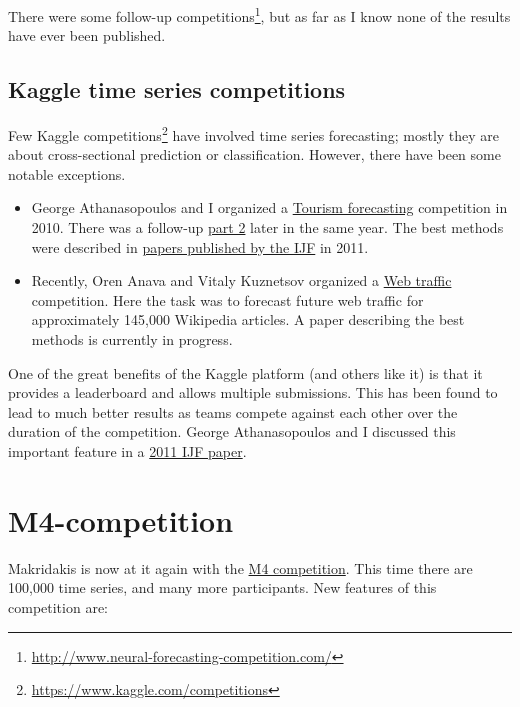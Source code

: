 \documentclass[11pt,a4paper,]{article}
\begin{document}
There were some follow-up competitions\footnote{\url{http://www.neural-forecasting-competition.com/}}, but as far as I know none of the results have ever been published.

\hypertarget{kaggle-time-series-competitions}{%
\subsection*{Kaggle time series competitions}\label{kaggle-time-series-competitions}}

Few Kaggle competitions\footnote{\url{https://www.kaggle.com/competitions}} have involved time series forecasting; mostly they are about cross-sectional prediction or classification. However, there have been some notable exceptions.

\begin{itemize}
\item
  George Athanasopoulos and I organized a \href{https://www.kaggle.com/c/tourism1}{Tourism forecasting} competition in 2010. There was a follow-up \href{https://www.kaggle.com/c/tourism2}{part 2} later in the same year. The best methods were described in \href{https://www.sciencedirect.com/journal/international-journal-of-forecasting/vol/27/issue/3}{papers published by the IJF} in 2011.
\item
  Recently, Oren Anava and Vitaly Kuznetsov organized a \href{https://www.kaggle.com/c/web-traffic-time-series-forecasting}{Web traffic} competition. Here the task was to forecast future web traffic for approximately 145,000 Wikipedia articles. A paper describing the best methods is currently in progress.
\end{itemize}

One of the great benefits of the Kaggle platform (and others like it) is that it provides a leaderboard and allows multiple submissions. This has been found to lead to much better results as teams compete against each other over the duration of the competition. George Athanasopoulos and I discussed this important feature in a \href{/publications/kaggle/}{2011 IJF paper}.

\hypertarget{m4-competition}{%
\section{M4-competition}\label{m4-competition}}

Makridakis is now at it again with the \href{https://www.m4.unic.ac.cy/}{M4 competition}. This time there are 100,000 time series, and many more participants. New features of this competition are:
\end{document}
